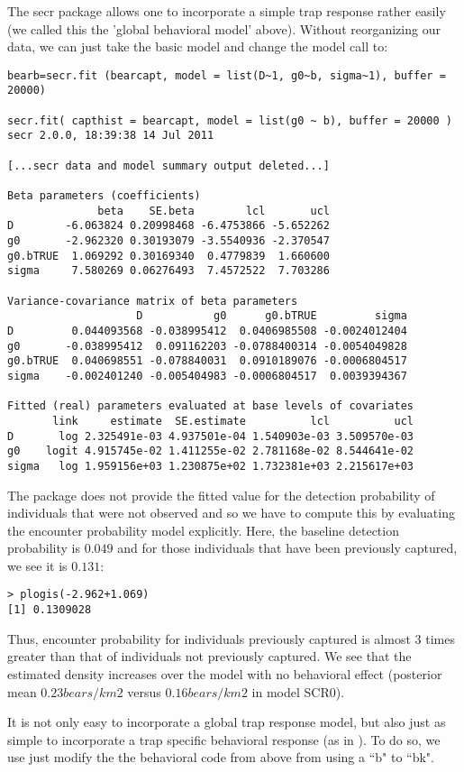 The secr package allows one to incorporate a simple trap response
rather easily (we called this the 'global behavioral model' above).
Without reorganizing our data, we can just take
the basic model and change the model call to:
{\small
\begin{verbatim}
bearb=secr.fit (bearcapt, model = list(D~1, g0~b, sigma~1), buffer = 20000)

secr.fit( capthist = bearcapt, model = list(g0 ~ b), buffer = 20000 )
secr 2.0.0, 18:39:38 14 Jul 2011

[...secr data and model summary output deleted...]

Beta parameters (coefficients)
              beta    SE.beta        lcl       ucl
D        -6.063824 0.20998468 -6.4753866 -5.652262
g0       -2.962320 0.30193079 -3.5540936 -2.370547
g0.bTRUE  1.069292 0.30169340  0.4779839  1.660600
sigma     7.580269 0.06276493  7.4572522  7.703286

Variance-covariance matrix of beta parameters
                    D           g0      g0.bTRUE         sigma
D         0.044093568 -0.038995412  0.0406985508 -0.0024012404
g0       -0.038995412  0.091162203 -0.0788400314 -0.0054049828
g0.bTRUE  0.040698551 -0.078840031  0.0910189076 -0.0006804517
sigma    -0.002401240 -0.005404983 -0.0006804517  0.0039394367

Fitted (real) parameters evaluated at base levels of covariates
       link     estimate  SE.estimate          lcl          ucl
D       log 2.325491e-03 4.937501e-04 1.540903e-03 3.509570e-03
g0    logit 4.915745e-02 1.411255e-02 2.781168e-02 8.544641e-02
sigma   log 1.959156e+03 1.230875e+02 1.732381e+03 2.215617e+03
\end{verbatim}
}
The package \secr does not provide the fitted value for the detection
probability of individuals that were not observed and so we have to
compute this by evaluating the encounter probability model explicitly.
Here, the baseline
detection probability is $0.049$ and for those individuals that have
been previously captured, we see it is $0.131$:
\begin{verbatim}
> plogis(-2.962+1.069)
[1] 0.1309028
\end{verbatim}
Thus, encounter probability for individuals previously captured is
almost 3 times greater than that of individuals
not previously captured.  We see that the
estimated density increases over the model with no behavioral effect
(posterior mean $0.23
bears/km2$ versus $0.16 bears/km2$ in model SCR0).

It is not only easy to incorporate a global trap response model, but also just as simple to
incorporate a trap specific behavioral response (as in
\citet{royle_etal:2009}).  To do so, we use just modify the
the behavioral code from above from using a ``b" to ``bk".

